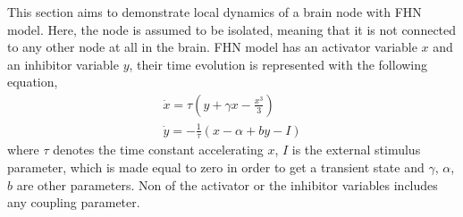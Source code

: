 This section aims to demonstrate local dynamics of a brain node with FHN model. Here, the node is assumed to be isolated, meaning that it is not connected to any other node at all in the brain. FHN model has an activator variable $x$ and an inhibitor variable $y$, their time evolution is represented with the following equation,
\begin{subequations}
\begin{align}\dot{x} = \tau (y + \gamma x - \frac{x^3}{3})  \label{eqn: frobenius 1}\\  \dot{y} = -\frac{1}{\tau} (x - \alpha + b y - I ) \label{eqn: frobenius 2}   \end{align} 
\end{subequations}
where $\tau$ denotes the time constant accelerating $x$, $I$ is the external stimulus parameter, which is made equal to zero in order to get a transient state and $\gamma$, $\alpha$, $b$ are other parameters. Non of the activator or the inhibitor variables includes any coupling parameter.

